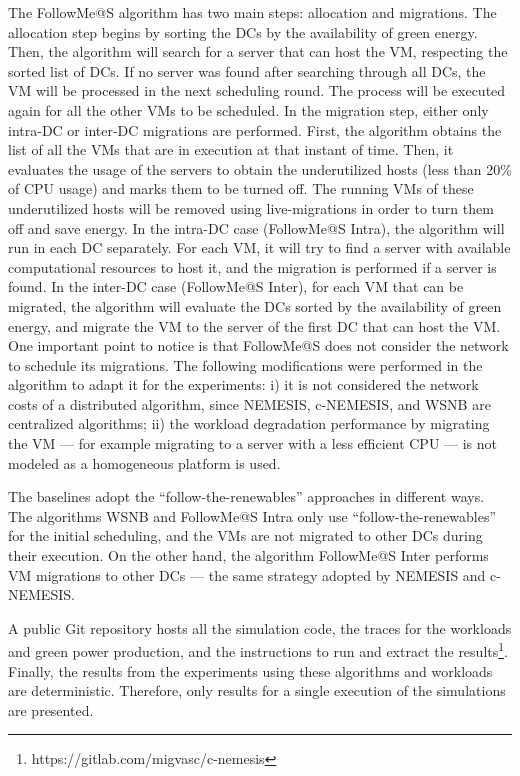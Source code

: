 The FollowMe@S algorithm has two main steps: allocation and migrations. The allocation step begins by sorting the DCs by the availability of green energy. Then, the algorithm will search for a server that can host the VM, respecting the sorted list of DCs. If no server was found after searching through all DCs, the VM will be processed in the next scheduling round. The process will be executed again for all the other VMs to be scheduled. In the migration step, either only intra-DC or inter-DC migrations are performed. First, the algorithm obtains the list of all the VMs that are in execution at that instant of time. Then, it evaluates the usage of the servers to obtain the underutilized hosts (less than 20\% of CPU usage) and marks them to be turned off. The running VMs of these underutilized hosts will be removed using live-migrations in order to turn them off and save energy. In the intra-DC case (FollowMe@S Intra), the algorithm will run in each DC separately. For each VM, it will try to find a server with available computational resources to host it, and the migration is performed if a server is found. In the inter-DC case (FollowMe@S Inter), for each VM that can be migrated, the algorithm will evaluate the DCs sorted by the availability of green energy, and migrate the VM to the server of the first DC that can host the VM. One important point to notice is that FollowMe@S does not consider the network to schedule its migrations. The following modifications were performed in the algorithm to adapt it for the experiments: i) it is not considered the network costs of a distributed algorithm, since NEMESIS, c-NEMESIS, and WSNB are centralized algorithms; ii) the workload degradation performance by migrating the VM --- for example migrating to a server with a less efficient CPU ---  is not modeled as a homogeneous platform is used.

The baselines adopt the ``follow-the-renewables'' approaches in different ways. The algorithms WSNB and FollowMe@S Intra only use ``follow-the-renewables'' for the initial scheduling, and the VMs are not migrated to other DCs during their execution. On the other hand, the algorithm FollowMe@S Inter performs VM migrations to other DCs --- the same strategy adopted by NEMESIS and c-NEMESIS.


A public Git repository hosts all the simulation code, the traces for the workloads and green power production, and the instructions to run and extract the results\footnote{https://gitlab.com/migvasc/c-nemesis}. Finally, the results from the experiments using these algorithms and workloads are deterministic. Therefore, only results for a single execution of the simulations are presented.


